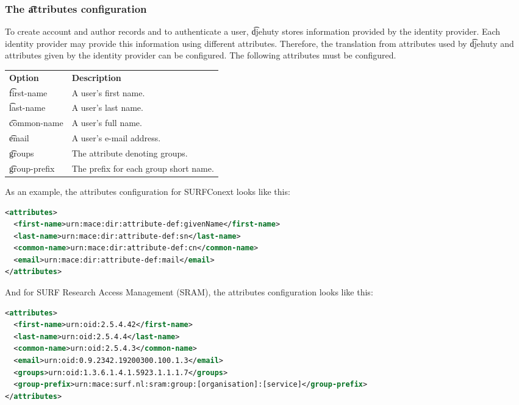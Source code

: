 \subsubsection{The \t{attributes} configuration}

  To create account and author records and to authenticate a user, \t{djehuty}
  stores information provided by the identity provider.  Each identity provider
  may provide this information using different attributes.  Therefore, the
  translation from attributes used by \t{djehuty} and attributes given by the
  identity provider can be configured.  The following attributes must be
  configured.

\begin{tabularx}{\textwidth}{*{1}{!{\VRule[-1pt]}l}!{\VRule[-1pt]}X}
  \headrow
  \textbf{Option}             & \textbf{Description}\\
  \t{first-name}              & A user's first name.\\
  \t{last-name}               & A user's last name.\\
  \t{common-name}             & A user's full name.\\
  \t{email}                   & A user's e-mail address.\\
  \t{groups}                  & The attribute denoting groups.\\
  \t{group-prefix}            & The prefix for each group short name.
\end{tabularx}

  As an example, the attributes configuration for SURFConext looks like this:

\begin{lstlisting}[language=xml]
<attributes>
  <first-name>urn:mace:dir:attribute-def:givenName</first-name>
  <last-name>urn:mace:dir:attribute-def:sn</last-name>
  <common-name>urn:mace:dir:attribute-def:cn</common-name>
  <email>urn:mace:dir:attribute-def:mail</email>
</attributes>
\end{lstlisting}

  And for SURF Research Access Management (SRAM), the attributes configuration
  looks like this:

\begin{lstlisting}[language=xml]
<attributes>
  <first-name>urn:oid:2.5.4.42</first-name>
  <last-name>urn:oid:2.5.4.4</last-name>
  <common-name>urn:oid:2.5.4.3</common-name>
  <email>urn:oid:0.9.2342.19200300.100.1.3</email>
  <groups>urn:oid:1.3.6.1.4.1.5923.1.1.1.7</groups>
  <group-prefix>urn:mace:surf.nl:sram:group:[organisation]:[service]</group-prefix>
</attributes>
\end{lstlisting}

